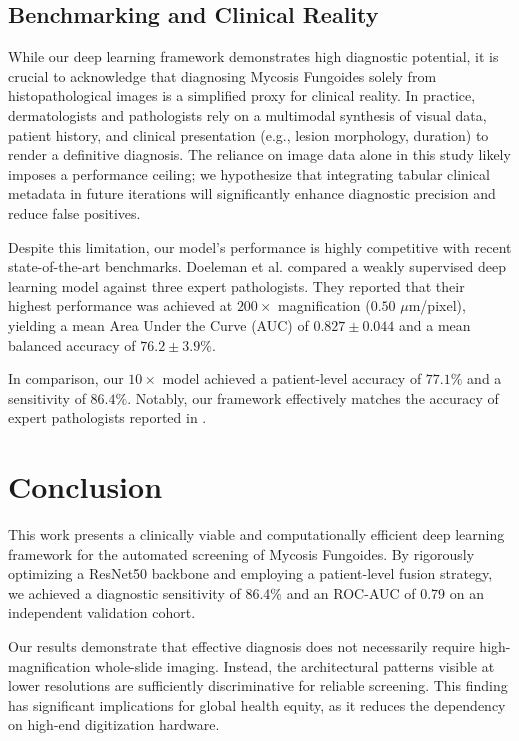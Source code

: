 \documentclass[conference]{IEEEtran}
\begin{document}
\subsection{Benchmarking and Clinical Reality}
While our deep learning framework demonstrates high diagnostic potential, it is crucial to acknowledge that diagnosing Mycosis Fungoides solely from histopathological images is a simplified proxy for clinical reality. In practice, dermatologists and pathologists rely on a multimodal synthesis of visual data, patient history, and clinical presentation (e.g., lesion morphology, duration) to render a definitive diagnosis. The reliance on image data alone in this study likely imposes a performance ceiling; we hypothesize that integrating tabular clinical metadata in future iterations will significantly enhance diagnostic precision and reduce false positives.

Despite this limitation, our model's performance is highly competitive with recent state-of-the-art benchmarks. Doeleman et al. \cite{Doeleman2024-MF} compared a weakly supervised deep learning model against three expert pathologists. They reported that their highest performance was achieved at $200\times$ magnification ($0.50$ $\mu$m/pixel), yielding a mean Area Under the Curve (AUC) of $0.827 \pm 0.044$ and a mean balanced accuracy of $76.2 \pm 3.9\%$.

In comparison, our $10\times$ model achieved a patient-level accuracy of $77.1\%$ and a sensitivity of $86.4\%$. Notably, our framework effectively matches the accuracy of expert pathologists reported in \cite{Doeleman2024-MF}. 
\section{Conclusion}
This work presents a clinically viable and computationally efficient deep learning framework for the automated screening of Mycosis Fungoides. By rigorously optimizing a ResNet50 backbone and employing a patient-level fusion strategy, we achieved a diagnostic sensitivity of 86.4\% and an ROC-AUC of 0.79 on an independent validation cohort.

Our results demonstrate that effective diagnosis does not necessarily require high-magnification whole-slide imaging. Instead, the architectural patterns visible at lower resolutions are sufficiently discriminative for reliable screening. This finding has significant implications for global health equity, as it reduces the dependency on high-end digitization hardware.
\end{document}
